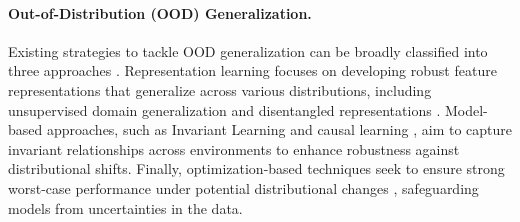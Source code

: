 \paragraph{Out-of-Distribution (OOD) Generalization.} 
Existing strategies to tackle OOD generalization can be broadly classified into three approaches \citep{yang2024generalized}. 
Representation learning focuses on developing robust feature representations that generalize across various distributions, including unsupervised domain generalization \citep{mahajan2021domain, zhang2022towards, chen2020improved} and disentangled representations \citep{bengio2013representation, higgins2017beta, kim2018disentangling, yang2021causalvae}. 
Model-based approaches, such as Invariant Learning \citep{risks-irm, ganin2015unsupervised, li2018domain, creager2021environment} and causal learning \citep{peters2016causal, pfister2019invariant}, aim to capture invariant relationships across environments to enhance robustness against distributional shifts. 
Finally, optimization-based techniques seek to ensure strong worst-case performance under potential distributional changes \citep{delage2010distributionally, namkoong2016stochastic,  duchi2021learning, duchi2023distributionally, zhou2022model}, safeguarding models from uncertainties in the data.


